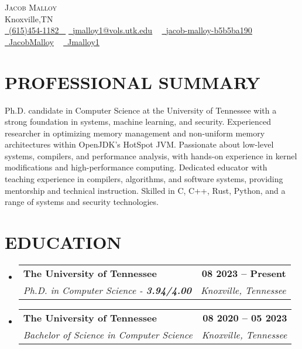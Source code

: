 \documentclass[letterpaper,10pt]{article}
\makeatletter
\newcommand{\resumeSubheading}[4]{
    \vspace{-2pt}\item
        \begin{tabular*}{1.0\textwidth}[t]{l@{\extracolsep{\fill}}r}
            \textbf{\large#1} & \textbf{\small #2} \\
            \textit{\large#3} & \textit{\small #4} \\

        \end{tabular*}\vspace{-7pt}
}
\newcommand{\resumeSubHeadingListStart}{\begin{itemize}[leftmargin=0.0in, label={}]}
\newcommand{\resumeSubHeadingListEnd}{\end{itemize}}
\makeatother
\begin{document}

\begin{center}
        {\Huge \scshape Jacob Malloy} \\ \vspace{1pt}
        Knoxville,TN \\ \vspace{1pt}
        \small \href{tel:+16154541182}{ \raisebox{-0.1\height}\faPhone\ \underline{(615)454-1182} ~} \href{mailto:jmalloy1@vols.utk.edu}{\raisebox{-0.2\height}\faEnvelope\  \underline{jmalloy1@vols.utk.edu}} ~
        \href{https://www.linkedin.com/in/jacob-malloy-b5b5ba190/}{\raisebox{-0.2\height}\faLinkedin\ \underline{jacob-malloy-b5b5ba190}}  ~
        \href{https://github.com/jacobmalloy}{\raisebox{-0.2\height}\faGithub\ \underline{JacobMalloy}} ~
        \href{https://gitlab.com/jmalloy1}{\raisebox{-0.2\height}\faGitlab\ \underline{Jmalloy1}} ~
        \vspace{-8pt}
\end{center}

\section{PROFESSIONAL SUMMARY}
Ph.D. candidate in Computer Science at the University of Tennessee with a strong foundation in systems, machine learning, and security. Experienced researcher in optimizing memory management and non-uniform memory architectures within OpenJDK’s HotSpot JVM. Passionate about low-level systems, compilers, and performance analysis, with hands-on experience in kernel modifications and high-performance computing. Dedicated educator with teaching experience in compilers, algorithms, and software systems, providing mentorship and technical instruction. Skilled in C, C++, Rust, Python, and a range of systems and security technologies.

\section{EDUCATION}
    \resumeSubHeadingListStart
        \resumeSubheading
            {The University of Tennessee}{08 2023 -- Present}
            {Ph.D. in Computer Science - \textbf{3.94/4.00}}{Knoxville, Tennessee}
        \resumeSubheading
            {The University of Tennessee}{08 2020 -- 05 2023}
            {Bachelor of Science in Computer Science}{Knoxville, Tennessee}
    \resumeSubHeadingListEnd
\end{document}
